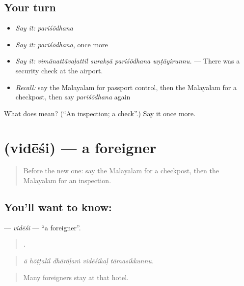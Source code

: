 \subsection*{Your turn}
\begin{itemize}
\raggedright
  \item \emph{Say it:} \emph{pariśōdhana}
  \item \emph{Say it:} \emph{pariśōdhana}, once more
  \item \emph{Say it:} \emph{vimānattāvaḷattil surakṣā pariśōdhana uṇṭāyirunnu.} — There was a security check at the airport.
  \item \emph{Recall:} say the Malayalam for passport control, then the Malayalam for a checkpost, then say \emph{pariśōdhana} again
\end{itemize}

\begin{tcolorbox}[breakable,colback=teal!4,colframe=teal!35!black,title={Before you move on}]
What does  mean? (\textquotedblleft{}An inspection; a check\textquotedblright{}.) Say it once more.
\end{tcolorbox}
\section[\texorpdfstring{\ml{വിദേശി} (vidēśi)}{വിദേശി (vidēśi)}]{ (vidēśi) — a foreigner}

\label{lesson:ML-C464-videsi}



\begin{quote}
Before the new one: say the Malayalam for a checkpost, then the Malayalam for an inspection.
\end{quote}

\subsection*{You'll want to know: }
\textbf{} — \emph{vidēśi} — \textquotedblleft{}a foreigner\textquotedblright{}.

\begin{quote}
    .
\end{quote}

\begin{quote}
\emph{ā hōṭṭalil dhārāḷaṁ vidēśikaḷ tāmasikkunnu.}
\end{quote}

\begin{quote}
Many foreigners stay at that hotel.
\end{quote}

